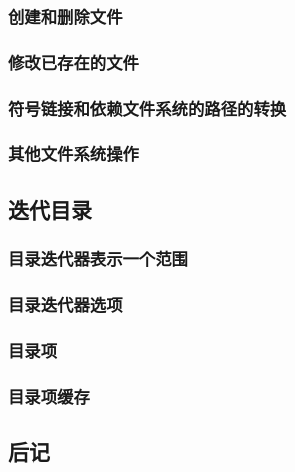 \subsubsection*{创建和删除文件}
\subsubsection*{修改已存在的文件}

\subsubsection{符号链接和依赖文件系统的路径的转换}\label{ch20.4.5}

\subsubsection{其他文件系统操作}

\subsection{迭代目录}
\subsubsection*{目录迭代器表示一个范围}
\subsubsection*{目录迭代器选项}

\subsubsection{目录项}
\subsubsection*{目录项缓存}

\subsection{后记}

\setcounter{footnote}{0}